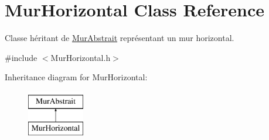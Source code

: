 \hypertarget{classMurHorizontal}{\section{Mur\-Horizontal Class Reference}
\label{classMurHorizontal}
}


Classe héritant de \hyperlink{classMurAbstrait}{Mur\-Abstrait} représentant un mur horizontal.  




{\ttfamily \#include $<$Mur\-Horizontal.\-h$>$}

Inheritance diagram for Mur\-Horizontal\-:\begin{figure}[H]
\begin{center}
\leavevmode
\includegraphics[height=2.000000cm]{classMurHorizontal}
\end{center}
\end{figure}
